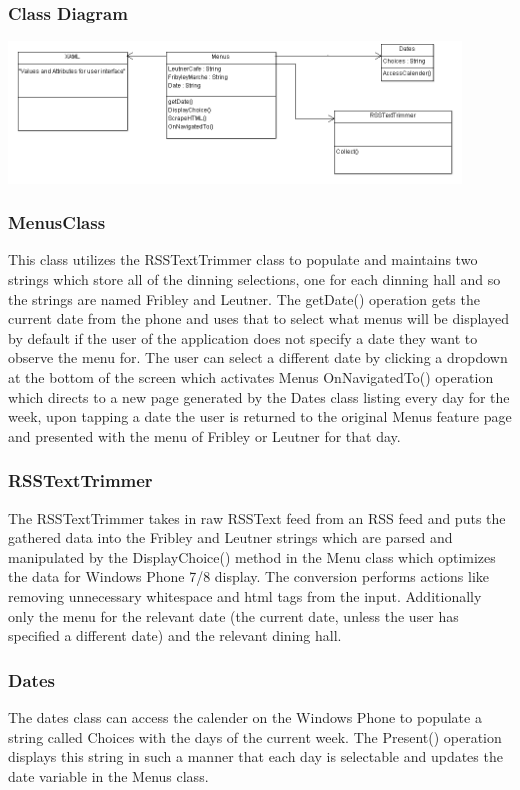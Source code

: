 \documentclass[pdftex,12pt,letter]{article}
\begin{document}
\subsubsection{Class Diagram}
\begin{flushleft}
\includegraphics[width=120mm]{MenuCD.png}
\end{flushleft}
\subsubsection{MenusClass}
This class utilizes the RSSTextTrimmer class to populate and maintains two strings which store all of the dinning selections, one for each dinning hall and so the strings are named Fribley and Leutner. The getDate() operation gets the current date from the phone and uses that to select what menus will be displayed by default if the user of the application does not specify a date they want to observe the menu for. The user can select a different date by clicking a dropdown at the bottom of the screen which activates Menus OnNavigatedTo() operation which directs to a new page generated by the Dates class listing every day for the week, upon tapping a date the user is returned to the original Menus feature page and presented with the menu of Fribley or Leutner for that day.
\subsubsection{RSSTextTrimmer}
The RSSTextTrimmer takes in raw RSSText feed from an RSS feed and
puts the gathered data into the Fribley and Leutner strings which are parsed and manipulated by the DisplayChoice() method in the Menu class which optimizes the data for Windows Phone 7/8 display. The conversion performs actions like removing
unnecessary whitespace and html tags from the input. Additionally only the menu for the relevant date (the current date, unless the user has specified a different date) and the relevant dining hall.
\subsubsection{Dates}
The dates class can access the calender on the Windows Phone to populate a string called Choices with the days of the current week. The Present() operation displays this string in such a manner that each day is selectable and updates the date variable in the Menus class.
\end{document}
